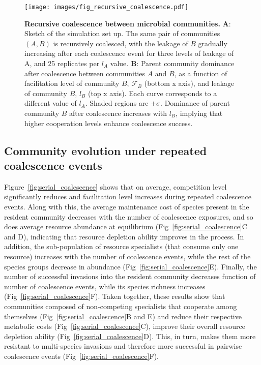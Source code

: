 \documentclass[10pt,letterpaper]{article}
\begin{document}
\begin{figure}[t]
\begin{adjustwidth}{-1.5in}{0in}
    \centering \texttt{[image: images/fig\_recursive\_coalescence.pdf]}
    \vspace{1pt}
    \caption{\textbf{Recursive coalescence between microbial communities.} \textbf{A}: Sketch of the simulation set up. The same pair of communities $(A, B)$ is recursively coalesced, with the leakage of $B$ gradually increasing after each coalescence event for three levels of leakage of A, and 25 replicates per $l_A$ value. \textbf{B}: Parent community dominance after coalescence between communities $A$ and $B$, as a function of facilitation level of community $B$, $\mathcal{F}_B$ (bottom x axis), and leakage of community $B$, $l_B$ (top x axis). Each curve corresponds to a different value of $l_A$. Shaded regions are $\pm \sigma$. Dominance of parent community $B$ after coalescence increases with $l_B$, implying that higher cooperation levels enhance coalescence success.}
    \label{fig:recursive_coalescence}
\end{adjustwidth}
\end{figure}

\subsection*{Community evolution under repeated coalescence events}

Figure~\ref{fig:serial_coalescence} shows that on average, competition level significantly reduces and facilitation level increases during repeated coalescence events. Along with this, the average maintenance cost of species present in the resident community decreases with the number of coalescence exposures, and so does average resource abundance at equilibrium (Fig~\ref{fig:serial_coalescence}C and D), indicating that resource depletion ability improves in the process. In addition, the sub-population of resource specialists (that consume only one resource) increases with the number of coalescence events, while the rest of the species groups decrease in abundance (Fig~\ref{fig:serial_coalescence}E). Finally, the number of successful invasions into the resident community decreases function of number of coalescence events, while its species richness increases (Fig~\ref{fig:serial_coalescence}F). Taken together, these results show that communities composed of non-competing specialists that cooperate among themselves (Fig~\ref{fig:serial_coalescence}B and E) and reduce their respective metabolic costs (Fig~\ref{fig:serial_coalescence}C), improve their overall resource depletion ability (Fig~\ref{fig:serial_coalescence}D). This, in turn, makes them more resistant to multi-species invasions and therefore more successful in pairwise coalescence events (Fig~\ref{fig:serial_coalescence}F). 
\end{document}
